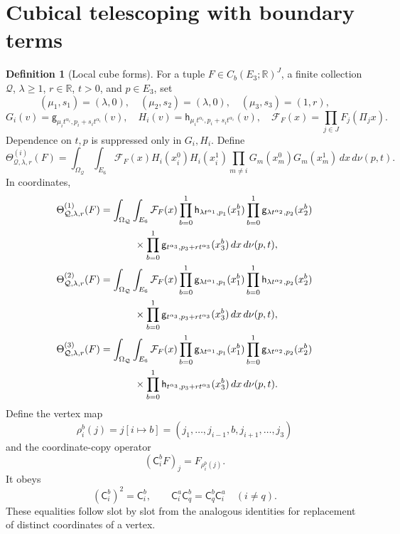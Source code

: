 \documentclass[12pt,reqno]{amsart}
\theoremstyle{plain}
\theoremstyle{definition}
\newtheorem{definition}[theorem]{Definition}
\theoremstyle{remark}
\numberwithin{equation}{section}
\newcommand{\R}{\mathbb R}
\newcommand{\g}{\mathsf g}
\newcommand{\h}{\mathsf h}
\newcommand{\dd}{\,d}
\begin{document}
\section{Cubical telescoping with boundary terms}

\begin{definition}[Local cube forms]\label{def:cube}
For a tuple $F\in C_b(E_3;\R)^J$, a finite collection $\mathcal Q$,
$\lambda\ge1$, $r\in\R$, $t>0$, and $p\in E_3$, set
\[
 (\mu_1,s_1)=(\lambda,0),\quad(\mu_2,s_2)=(\lambda,0),\quad
 (\mu_3,s_3)=(1,r),
\]
\[
 G_i(v)=\g_{\mu_i t^{\alpha_i},p_i+s_it^{\alpha_i}}(v),\quad
 H_i(v)=\h_{\mu_i t^{\alpha_i},p_i+s_it^{\alpha_i}}(v),\quad
 \mathcal F_F(x)=\prod_{j\in J}F_j(\Pi_jx).
\]
Dependence on $t,p$ is suppressed only in $G_i,H_i$.
Define
\begin{equation}\label{eq:cubeform}
 \Theta^{(i)}_{\mathcal Q,\lambda,r}(F)=
 \int_{\Omega_{\mathcal Q}}\int_{E_6}\mathcal F_F(x)
 H_i(x_i^0)H_i(x_i^1)
 \prod_{m\ne i}G_m(x_m^0)G_m(x_m^1)\dd x\,d\nu(p,t).
\end{equation}
In coordinates,
\begin{align}
 \Theta^{(1)}_{\mathcal Q,\lambda,r}(F)
 &=\int_{\Omega_{\mathcal Q}}\int_{E_6}\mathcal F_F(x)
       \prod_{b=0}^1\h_{\lambda t^{\alpha_1},p_1}(x_1^b)
       \prod_{b=0}^1\g_{\lambda t^{\alpha_2},p_2}(x_2^b)\notag\\
 &\hspace{12mm}\times\prod_{b=0}^1\g_{t^{\alpha_3},p_3+rt^{\alpha_3}}(x_3^b)
       \dd x\,d\nu(p,t),\label{eq:cubeform_first}\\
 \Theta^{(2)}_{\mathcal Q,\lambda,r}(F)
 &=\int_{\Omega_{\mathcal Q}}\int_{E_6}\mathcal F_F(x)
       \prod_{b=0}^1\g_{\lambda t^{\alpha_1},p_1}(x_1^b)
       \prod_{b=0}^1\h_{\lambda t^{\alpha_2},p_2}(x_2^b)\notag\\
 &\hspace{12mm}\times\prod_{b=0}^1\g_{t^{\alpha_3},p_3+rt^{\alpha_3}}(x_3^b)
       \dd x\,d\nu(p,t),\label{eq:cubeform_second}\\
 \Theta^{(3)}_{\mathcal Q,\lambda,r}(F)
 &=\int_{\Omega_{\mathcal Q}}\int_{E_6}\mathcal F_F(x)
       \prod_{b=0}^1\g_{\lambda t^{\alpha_1},p_1}(x_1^b)
       \prod_{b=0}^1\g_{\lambda t^{\alpha_2},p_2}(x_2^b)\notag\\
 &\hspace{12mm}\times\prod_{b=0}^1\h_{t^{\alpha_3},p_3+rt^{\alpha_3}}(x_3^b)
       \dd x\,d\nu(p,t).\label{eq:cubeform_third}
\end{align}
Define the vertex map
\[
 \rho_i^b(j)=j[i\mapsto b]
 =(j_1,\ldots,j_{i-1},b,j_{i+1},\ldots,j_3)
\]
and the coordinate-copy operator
\[
 (\mathsf C_i^bF)_j=F_{\rho_i^b(j)}.
\]
It obeys
\[
 (\mathsf C_i^b)^2=\mathsf C_i^b,\qquad
 \mathsf C_i^a\mathsf C_q^b=\mathsf C_q^b\mathsf C_i^a
 \quad(i\ne q).
\]
These equalities follow slot by slot from the analogous identities
for replacement of distinct coordinates of a vertex.
\end{definition}
\end{document}

